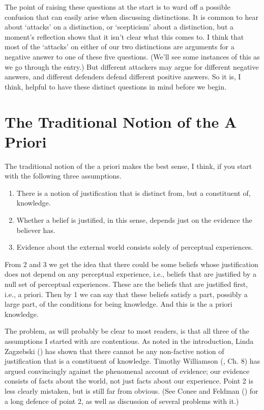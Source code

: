\documentclass[
  11pt,
  letterpaper,
  DIV=11,
  numbers=noendperiod,
  twoside]{scrartcl}
\providecommand{\tightlist}{%
  \setlength{\itemsep}{0pt}\setlength{\parskip}{0pt}}
\begin{document}
The point of raising these questions at the start is to ward off a
possible confusion that can easily arise when discussing distinctions.
It is common to hear about `attacks' on a distinction, or `scepticism'
about a distinction, but a moment's reflection shows that it isn't clear
what this comes to. I think that most of the `attacks' on either of our
two distinctions are arguments for a negative answer to one of these
five questions. (We'll see some instances of this as we go through the
entry.) But different attackers may argue for different negative
answers, and different defenders defend different positive answers. So
it is, I think, helpful to have these distinct questions in mind before
we begin.

\section{The Traditional Notion of the A
Priori}\label{thetraditionalnotionoftheapriori}

The traditional notion of the a priori makes the best sense, I think, if
you start with the following three assumptions.

\begin{enumerate}
\def\labelenumi{\arabic{enumi}.}
\tightlist
\item
  There is a notion of justification that is distinct from, but a
  constituent of, knowledge.
\item
  Whether a belief is justified, in this sense, depends just on the
  evidence the believer has.
\item
  Evidence about the external world consists solely of perceptual
  experiences.
\end{enumerate}

From 2 and 3 we get the idea that there could be some beliefs whose
justification does not depend on any perceptual experience, i.e.,
beliefs that are justified by a null set of perceptual experiences.
These are the beliefs that are justified first, i.e., a priori. Then by
1 we can say that these beliefs satisfy a part, possibly a large part,
of the conditions for being knowledge. And this is the a priori
knowledge.

The problem, as will probably be clear to most readers, is that all
three of the assumptions I started with are contentious. As noted in the
introduction, Linda Zagzebski () has
shown that there cannot be any non-factive notion of justification that
is a constituent of knowledge. Timothy Williamson
(, Ch. 8) has argued
convincingly against the phenomenal account of evidence; our evidence
consists of facts about the world, not just facts about our experience.
Point 2 is less clearly mistaken, but is still far from obvious. (See
Conee and Feldman () for a long
defence of point 2, as well as discussion of several problems with it.)
\end{document}
